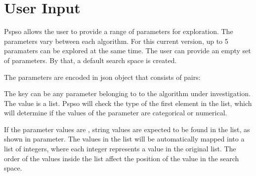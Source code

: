 \documentclass[letterpaper,10pt,english]{sphinxmanual}
\begin{document}
\section{User Input}
\label{\detokenize{index:user-input}}
Pspso allows the user to provide a range of parameters for exploration.
The parameters vary between each algorithm.
For this current version, up to 5 paramaters can be explored at the same time.
The user can provide an empty set of parameters. By that, a default search space is created.


The parameters are encoded in json object that consists of  pairs:

\begin{sphinxVerbatim}[commandchars=\\\{\}]
  
        \PYG{p}{[}\PYG{p}{]}
          \PYG{p}{[}\PYG{p}{]}
         \PYG{p}{[}\PYG{p}{]}
         \PYG{p}{[}\PYG{p}{]}
         \PYG{p}{[}\PYG{p}{]}
\end{sphinxVerbatim}

The key can be any parameter belonging to to the algorithm under investigation.
The value is a list.
Pspso will check the type of the first element in the list, which will determine if the values of the parameter are categorical or numerical.


If the parameter values are , string values are expected to be found in the list, as shown in  parameter.
The values in the list will be automatically mapped into a list of integers, where each integer represents a value in the original list.
The order of the values inside the list affect the position of the value in the search space.
\end{document}
